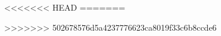 \documentclass[12pt,oneside,onecolumn, letterpaper]{book}
\begin{document}
		
	
	\tableofcontents
	
<<<<<<< HEAD
=======
	
	
	
	
	
	
	
	
	
	\printbibliography
>>>>>>> 502678576d5a4237776623ca8019f33c6b8ccde6
	
	
\end{document}
